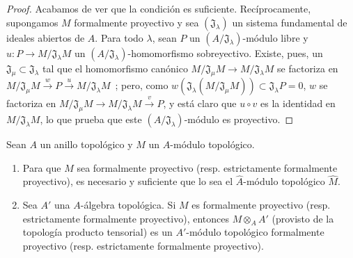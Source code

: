 \begin{proof}
Acabamos de ver que la condición es suficiente. Recíprocamente, supongamos $M$
formalmente proyectivo y sea $(\mathfrak J_\lambda)$ un sistema fundamental
de ideales abiertos de $A$. Para todo $\lambda$, sean $P$ un
$(A/\mathfrak J_\lambda)$-módulo libre y
$u:P\to M/\mathfrak J_\lambda M$ un
$(A/\mathfrak J_\lambda)$-homomorfismo sobreyectivo. Existe, pues, un
$\mathfrak J_\mu\subset\mathfrak J_\lambda$ tal que el homomorfismo canónico
$M/\mathfrak J_\mu M\to M/\mathfrak J_\lambda M$ se factoriza en
$M/\mathfrak J_\mu M\xrightarrow{w}P\xrightarrow{u}M/\mathfrak J_\lambda M$~;
pero, como
$w(\mathfrak J_\lambda(M/\mathfrak J_\mu M))\subset\mathfrak J_\lambda P=0$,
$w$ se factoriza en $M/\mathfrak J_\mu M\to M/\mathfrak J_\lambda M\xrightarrow{v}P$, y está
claro que $u\circ v$ es la identidad en $M/\mathfrak J_\lambda M$, lo que
prueba que este $(A/\mathfrak J_\lambda)$-módulo es proyectivo.
\end{proof}

\begin{proposition}[19.2.5]
\label{0.19.2.5-fr}
Sean $A$ un anillo topológico y $M$ un $A$-módulo topológico.
\begin{enumerate}
  \item[\textup{(i)}] Para que $M$ sea formalmente proyectivo \textup{(resp.} estrictamente
  formalmente proyectivo\textup{)}, es necesario y suficiente que lo sea el
  $\hat A$-módulo topológico $\hat M$.
  \item[\textup{(ii)}] Sea $A'$ una $A$-álgebra topológica. Si $M$ es formalmente
  proyectivo \textup{(resp.} estrictamente formalmente proyectivo\textup{)}, entonces
  $M\otimes_A A'$ (provisto de la topología producto tensorial) es un
  $A'$-módulo topológico formalmente proyectivo \textup{(resp.} estrictamente formalmente
  proyectivo\textup{)}.
\end{enumerate}
\end{proposition}

